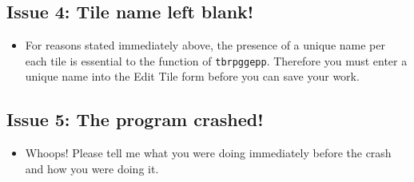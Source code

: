\documentclass{article} \usepackage[margin=1in,headheight=57pt,headsep=0.1in]{geometry}
\begin{document}
\subsection{Issue 4: Tile name left blank!}
\begin{itemize}
	\item For reasons stated immediately above, the presence of a unique name per each tile is essential to the function of \texttt{tbrpggepp}. Therefore you must enter a unique name into the Edit Tile form before you can save your work.
\end{itemize}
\subsection{Issue 5: The program crashed!}
\begin{itemize}
	\item Whoops! Please tell me what you were doing immediately before the crash and how you were doing it.
\end{itemize}
\end{document}
